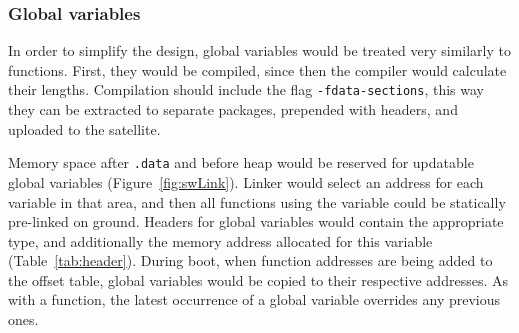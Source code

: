 \subsubsection{Global variables}

In order to simplify the design, global variables would be treated very similarly to functions. First, they would be compiled, since then the compiler would calculate their lengths. Compilation should include the flag \texttt{-fdata-sections}, this way they can be extracted to separate packages, prepended with headers, and uploaded to the satellite.

Memory space after \texttt{.data} and before heap would be reserved for updatable global variables  (Figure~\ref{fig:swLink}). Linker would select an address for each variable in that area, and then all functions using the variable could be statically pre-linked on ground. Headers for global variables would contain the appropriate type, and additionally the memory address allocated for this variable (Table~\ref{tab:header}). During boot, when function addresses are being added to the offset table, global variables would be copied to their respective addresses. As with a function, the latest occurrence of a global variable overrides any previous ones.

